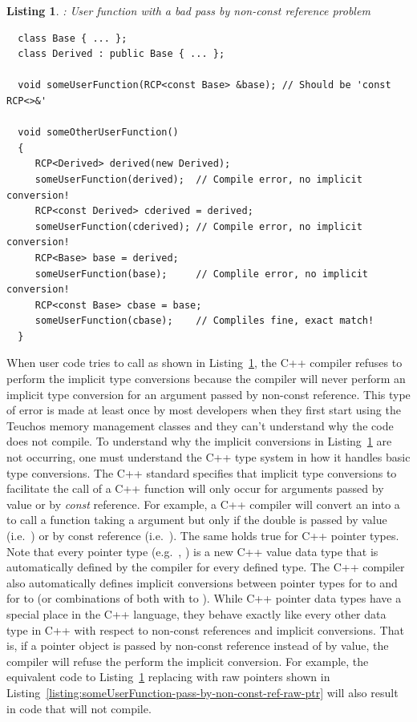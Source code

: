 \documentclass[pdf,ps2pdf,11pt]{SANDreport}
\newtheorem{listing}{Listing}
\begin{document}
{}\begin{listing}: User function with a bad pass by non-const
reference problem
\label{listing:someUserFunction-pass-by-non-const-ref}
{\small\begin{verbatim}
  class Base { ... };
  class Derived : public Base { ... };

  void someUserFunction(RCP<const Base> &base); // Should be 'const RCP<>&'

  void someOtherUserFunction()
  {
     RCP<Derived> derived(new Derived);
     someUserFunction(derived);  // Compile error, no implicit conversion!
     RCP<const Derived> cderived = derived;
     someUserFunction(cderived); // Compile error, no implicit conversion!
     RCP<Base> base = derived;
     someUserFunction(base);     // Complile error, no implicit conversion!
     RCP<const Base> cbase = base;
     someUserFunction(cbase);    // Compliles fine, exact match!
  }
\end{verbatim}}
\end{listing}


When user code tries to call {} as shown in
Listing~\ref{listing:someUserFunction-pass-by-non-const-ref}, the C++
compiler refuses to perform the implicit type conversions because the
compiler will never perform an implicit type conversion for an
argument passed by non-const reference.  This type of error is made at
least once by most developers when they first start using the Teuchos
memory management classes and they can't understand why the code does
not compile.  To understand why the implicit conversions in
Listing~\ref{listing:someUserFunction-pass-by-non-const-ref} are not
occurring, one must understand the C++ type system in how it handles
basic type conversions.  The C++ standard specifies that implicit type
conversions to facilitate the call of a C++ function will only occur
for arguments passed by value or by {}\textit{const} reference.  For
example, a C++ compiler will convert an {} into a
{} to call a function taking a {} argument but
only if the double is passed by value (i.e.\ {}) or by
const reference (i.e.\ {}).  The same holds true
for C++ pointer types.  Note that every pointer type (e.g.\
{}, {}) is a new C++ value data type that is
automatically defined by the compiler for every defined type.  The C++
compiler also automatically defines implicit conversions between
pointer types for {}\ttt{T*} to {}\ttt{const T*} and for
{} to {} (or combinations of both with
{}\ttt{Derived*} to {}).  While C++ pointer data
types have a special place in the C++ language, they behave exactly
like every other data type in C++ with respect to non-const references
and implicit conversions.  That is, if a pointer object is passed by
non-const reference instead of by value, the compiler will refuse the
perform the implicit conversion.  For example, the equivalent code to
Listing~\ref{listing:someUserFunction-pass-by-non-const-ref} replacing
{}\ttt{RCP} with raw pointers shown in
Listing~\ref{listing:someUserFunction-pass-by-non-const-ref-raw-ptr}
will also result in code that will not compile.
\end{document}
